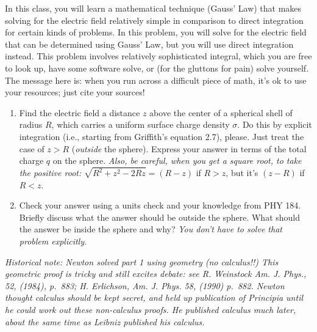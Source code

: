 \documentclass[11pt]{article}
\def\tightlist{}
\begin{document}
In this class, you will learn a mathematical technique (Gauss' Law) that
makes solving for the electric field relatively simple in comparison to
direct integration for certain kinds of problems. In this problem, you
will solve for the electric field that can be determined using Gauss'
Law, but you will use direct integration instead. This problem involves
relatively sophisticated integral, which you are free to look up, have
some software solve, or (for the gluttons for pain) solve yourself. The
message here is: when you run across a difficult piece of math, it's ok
to use your resources; just cite your sources!

\begin{enumerate}
\def\labelenumi{\arabic{enumi}.}
\tightlist
\item
  Find the electric field a distance \(z\) above the center of a
  spherical shell of radius \(R\), which carries a uniform surface
  charge density \(\sigma\). Do this by explicit integration (i.e.,
  starting from Griffith's equation 2.7), please. Just treat the case of
  \(z > R\) (\emph{outside} the sphere). Express your answer in terms of
  the total charge \(q\) on the sphere. \emph{Also, be careful, when you
  get a square root, to take the positive root:}
  \(\sqrt{R^2 + z^2 - 2Rz}=(R-z)\) if \(R>z\), but it's \((z-R)\) if
  \(R<z\).
\item
  Check your answer using a units check and your knowledge from PHY 184.
  Briefly discuss what the answer should be outside the sphere. What
  should the answer be inside the sphere and why? \emph{You don't have
  to solve that problem explicitly.}
\end{enumerate}

\emph{Historical note: Newton solved part 1 using geometry (no
calculus!!) This geometric proof is tricky and still excites debate: see
R. Weinstock Am. J. Phys., 52, (1984), p.~883; H. Erlichson, Am. J.
Phys. 58, (1990) p.~882. Newton thought calculus should be kept secret,
and held up publication of Principia until he could work out these
non-calculus proofs. He published calculus much later, about the same
time as Leibniz published his calculus.}
\end{document}
